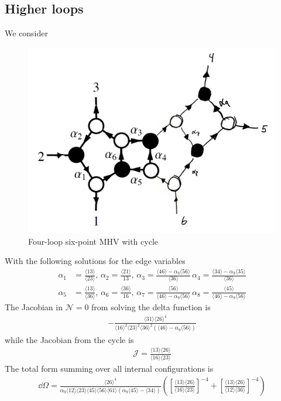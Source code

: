 \documentclass[letter,11pt]{article}
\newcommand{\ab}[1]{\langle #1 \rangle}
\begin{document}
\subsection{Higher loops}
We consider
\begin{figure}[H]
	\centering
	\includegraphics[width=0.4\linewidth]{6pt4l_1}
	\caption{Four-loop six-point MHV with cycle}
	\label{fig:two-loop}
\end{figure}
\noindent
With the following solutions for the edge variables
\begin{equation}
	\begin{aligned}
		\alpha_1&=\frac{\ab{13}}{\ab{23}},\,\alpha_2=\frac{\ab{21}}{13},\,\alpha_3=\frac{\ab{46}-\alpha_9\ab{56}}{\ab{36}}\,\alpha_4=\frac{\ab{34}-\alpha_9\ab{35}}{\ab{36}}\\
		\alpha_5&=\frac{\ab{13}}{\ab{36}},\,\alpha_6=\frac{\ab{36}}{16},\,\alpha_7=\frac{\ab{56}}{\ab{46}-\alpha_9\ab{56}}\,\alpha_8=\frac{\ab{45}}{\ab{46}-\alpha_9\ab{56}}
	\end{aligned}
\end{equation}
The Jacobian in $\mathcal{N}=0$ from solving the delta function is 
\begin{equation}
	\begin{aligned}
		-\frac{\ab{31}\ab{26}^4}{\ab{16}^2\ab{23}^2\ab{36}^2\left(\ab{46}-\alpha_9 \ab{56}\right)}
	\end{aligned}
\end{equation}
while the Jacobian from the cycle is
\begin{equation}
	\begin{aligned}
		\mathcal{J}=\frac{\ab{13}\ab{26}}{\ab{16}\ab{23}}
	\end{aligned}
\end{equation}
The total form summing over all internal configurations is
\begin{equation}
	\begin{aligned}
		\dd\Omega =\frac{\ab{26}^4}{\alpha_9 \ab{12}\ab{23}\ab{45}\ab{56}\ab{61}\left(\alpha_9\ab{45}-\ab{34}\right)}\left(	\left[\frac{\ab{13}\ab{26}}{\ab{16}\ab{23}}\right]^{-4}+
		\left[\frac{\ab{13}\ab{26}}{\ab{12}\ab{36}}\right]^{-4}\right)
	\end{aligned}
\end{equation}
\end{document}
